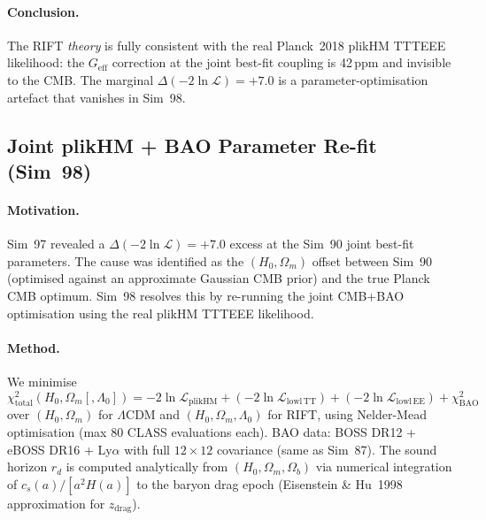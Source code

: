 \documentclass[12pt,a4paper]{article}
\begin{document}
\paragraph{Conclusion.}
The RIFT \emph{theory} is fully consistent with the real Planck~2018 plikHM TTTEEE
likelihood: the $G_\mathrm{eff}$ correction at the joint best-fit coupling is
42\,ppm and invisible to the CMB.  The marginal $\Delta(-2\ln\mathcal{L})=+7.0$
is a parameter-optimisation artefact that vanishes in Sim~98.

\subsection{Joint plikHM + BAO Parameter Re-fit (Sim~98)}
\label{sec:obs_sim98}

\paragraph{Motivation.}  Sim~97 revealed a $\Delta(-2\ln\mathcal{L})=+7.0$ excess
at the Sim~90 joint best-fit parameters.  The cause was identified as the
$(H_0,\Omega_m)$ offset between Sim~90 (optimised against an approximate Gaussian
CMB prior) and the true Planck CMB optimum.  Sim~98 resolves this by re-running
the joint CMB+BAO optimisation using the real plikHM TTTEEE likelihood.

\paragraph{Method.}  We minimise
\begin{equation}
  \chi^2_\mathrm{total}(H_0, \Omega_m [, \Lambda_0])
  = -2\ln\mathcal{L}_\mathrm{plikHM} + (-2\ln\mathcal{L}_\mathrm{lowl\,TT})
    + (-2\ln\mathcal{L}_\mathrm{lowl\,EE}) + \chi^2_\mathrm{BAO}
\end{equation}
over $(H_0, \Omega_m)$ for $\Lambda$CDM and $(H_0, \Omega_m, \Lambda_0)$ for RIFT,
using Nelder-Mead optimisation (max 80 CLASS evaluations each).
BAO data: BOSS DR12 + eBOSS DR16 + Ly$\alpha$ with full $12\times12$ covariance
(same as Sim~87). The sound horizon $r_d$ is computed analytically from $(H_0, \Omega_m,
\Omega_b)$ via numerical integration of $c_s(a)/[a^2 H(a)]$ to the baryon drag epoch
(Eisenstein \& Hu~1998 approximation for $z_\mathrm{drag}$).
\end{document}
